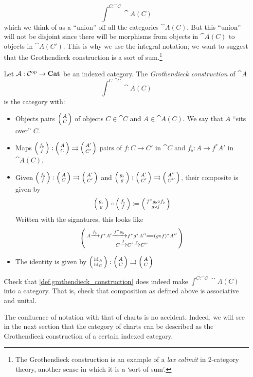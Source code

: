 \documentclass[DynamicalBook]{subfiles}
\begin{document}
$$\int^{C : \cat{C}} \cat{A}(C)$$
which we think of as a ``union'' off all the categories $\cat{A}(C)$. But this
``union'' will not be
disjoint since there will be morphisms from objects in $\cat{A}(C)$ to objects
in $\cat{A}(C')$. This is why we use the integral notation; we want to suggest
that the Grothendieck construction is a sort of sum.\footnote{The Grothendieck
  construction is an example of a \emph{lax colimit} in 2-category theory,
  another sense in which it is a `sort of sum'.}
\begin{definition}\label{def.grothendieck_construction}
  Let $\mathcal{A} : \mathcal{C}^{\textnormal{op}} \to \textbf{Cat}$ be an indexed category. The
  \emph{Grothendieck construction} of $\cat{A}$
  $$\int^{C : \cat{C}} \cat{A}(C)$$
  is the category with:
  \begin{itemize}
    \item Objects pairs $\lens{A}{C}$ of objects $C \in \cat{C}$ and $A \in
      \cat{A}(C)$. We say that $A$ ``sits over'' $C$.
    \item Maps $\lens{f_{\flat}}{f} : \lens{A}{C} \rightrightarrows
      \lens{A'}{C'}$ pairs of $f : C \to C'$ in $\cat{C}$ and $f_{\flat} :
      A \to f^{\ast}A'$ in $\cat{A}(C)$.
    \item Given $\lens{f_{\flat}}{f} : \lens{A}{C} \rightrightarrows
      \lens{A'}{C'}$ and $\lens{g_{\flat}}{g} : \lens{A'}{C'} \rightrightarrows
      \lens{A''}{C''}$, their composite is given by
      $$\lens{g_{\flat}}{g} \circ \lens{f_{\flat}}{f} \coloneqq \lens{f^{\ast}g_{\flat}
      \circ f_{\flat}}{g \circ f}$$
    Written with the signatures, this looks like
    $$\lens{A \xto{f_{\flat}} f^{\ast}A' \xto{f^{\ast}g_{\flat}}
      f^{\ast}g^{\ast}A'' \xequals{\phantom{\gamma}} (g \circ f)^\ast A''}{C \xto{f} C' \xto{g} C''}$$
    \item The identity is given by $\lens{\id_A}{\id_C} : \lens{A}{C}
      \rightrightarrows \lens{A}{C}$
  \end{itemize}
\end{definition}

\begin{exercise}
  Check that \cref{def.grothendieck_construction} does indeed make $\int^{C :
    \cat{C}} \cat{A}(C)$ into a category. That is, check that composition as
  defined above is associative and unital.
\end{exercise}

The confluence of notation with that of charts is no accident. Indeed, we will
see in the next section that the category of charts can be described as the
Grothendieck construction of a certain indexed category.
\end{document}

